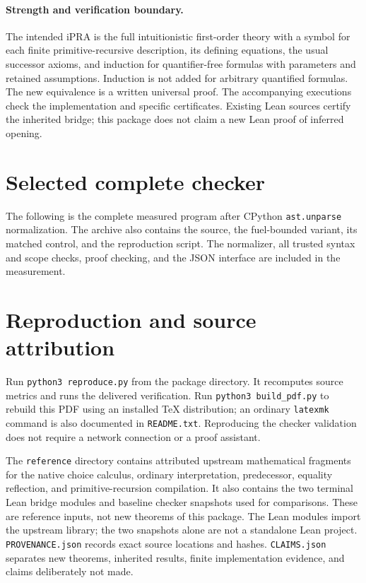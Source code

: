 \documentclass[11pt,a4paper]{article}
\theoremstyle{definition}\newtheorem{definition}[theorem]{Definition}
\theoremstyle{remark}\newtheorem{remark}[theorem]{Remark}
\begin{document}
\paragraph{Strength and verification boundary.}
The intended iPRA is the full intuitionistic first-order theory with a
symbol for each finite primitive-recursive description, its defining
equations, the usual successor axioms, and induction for quantifier-free
formulas with parameters and retained assumptions. Induction is not added
for arbitrary quantified formulas. The new equivalence is a written
universal proof. The accompanying executions check the implementation and
specific certificates. Existing Lean sources certify the inherited bridge;
this package does not claim a new Lean proof of inferred opening.






\appendix
\section{Selected complete checker}
The following is the complete measured program after CPython
\texttt{ast.unparse} normalization. The archive also contains the source,
the fuel-bounded variant, its matched control, and the reproduction
script. The normalizer, all trusted syntax and scope checks, proof checking,
and the JSON interface are included in the measurement.


\section{Reproduction and source attribution}
Run \texttt{python3 reproduce.py} from the package directory. It recomputes
source metrics and runs the delivered verification. Run
\texttt{python3 build\_pdf.py} to rebuild this PDF using an installed TeX
distribution; an ordinary \texttt{latexmk} command is also documented in
\texttt{README.txt}. Reproducing the checker validation does not require a
network connection or a proof assistant.

The \texttt{reference} directory contains attributed upstream mathematical
fragments for the native choice calculus, ordinary interpretation,
predecessor, equality reflection, and primitive-recursion compilation.
It also contains the two terminal Lean bridge modules and baseline checker
snapshots used for comparisons. These are reference inputs, not new
theorems of this package. The Lean modules import the upstream library;
the two snapshots alone are not a standalone Lean project.
\texttt{PROVENANCE.json} records exact source locations and hashes.
\texttt{CLAIMS.json} separates new theorems, inherited results, finite
implementation evidence, and claims deliberately not made.
\end{document}
